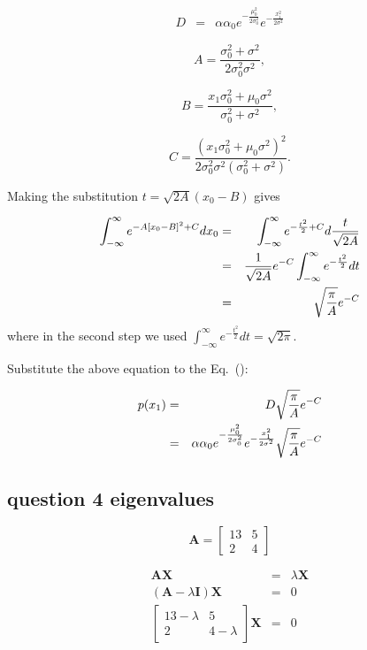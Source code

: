 \documentclass[english,11pt]{article}
\begin{document}
\begin{eqnarray}
D & = & \alpha\alpha_{0}e^{-\frac{\mu_{0}^{2}}{2\sigma_{0}^{2}}}e^{-\frac{x_{1}^{2}}{2\sigma^{2}}}
\end{eqnarray}

\begin{equation}
A=\frac{\sigma_{0}^{2}+\sigma^{2}}{2\sigma_{0}^{2}\sigma^{2}},    
\end{equation}


\begin{equation}
B=\frac{x_{1}\sigma_{0}^{2}+\mu_{0}\sigma^{2}}{\sigma_{0}^{2}+\sigma^{2}},
\end{equation}


\begin{equation}
C=\frac{(x_{1}\sigma_{0}^{2}+\mu_{0}\sigma^{2})^{2}}{2\sigma_{0}^{2}\sigma^{2}(\sigma_{0}^{2}+\sigma^{2})}.    
\end{equation}


Making the substitution $t=\sqrt{2A}(x_{0}-B)$ gives

\begin{eqnarray}
\int_{-\infty}^{\infty}e^{-A[x_{0}-B]^{2}+C}dx_{0} & = & \int_{-\infty}^{\infty}e^{-\frac{t^{2}}{2}+C}d\frac{t}{\sqrt{2A}} \notag \\
 & = & \frac{1}{\sqrt{2A}}e^{-C}\int_{-\infty}^{\infty}e^{-\frac{t^{2}}{2}}dt \notag \\
 & = & \sqrt{\frac{\pi}{A}}e^{-C}
\end{eqnarray}
where in the second step we used $\int_{-\infty}^{\infty}e^{-\frac{t^{2}}{2}}dt=\sqrt{2\pi}$. 

Substitute the above equation to the Eq.~():

\begin{eqnarray}
p(x_{1}) & = & D\sqrt{\frac{\pi}{A}}e^{-C} \notag \\
 & = & \alpha\alpha_{0}e^{-\frac{\mu_{0}^{2}}{2\sigma_{0}^{2}}}e^{-\frac{x_{1}^{2}}{2\sigma^{2}}}\sqrt{\frac{\pi}{A}}e^{-C}
\end{eqnarray}

\subsection{question 4 eigenvalues}

\[
\boldsymbol{A}=\left[\begin{array}{cc}
13 & 5\\
2 & 4
\end{array}\right]
\]

\begin{eqnarray*}
\boldsymbol{A}\boldsymbol{X} & = & \lambda\boldsymbol{X}\\
(\boldsymbol{A}-\lambda\boldsymbol{I})\boldsymbol{X} & = & 0\\
\left[\begin{array}{cc}
13-\lambda & 5\\
2 & 4-\lambda
\end{array}\right]\boldsymbol{X} & = & 0
\end{eqnarray*}
\end{document}
